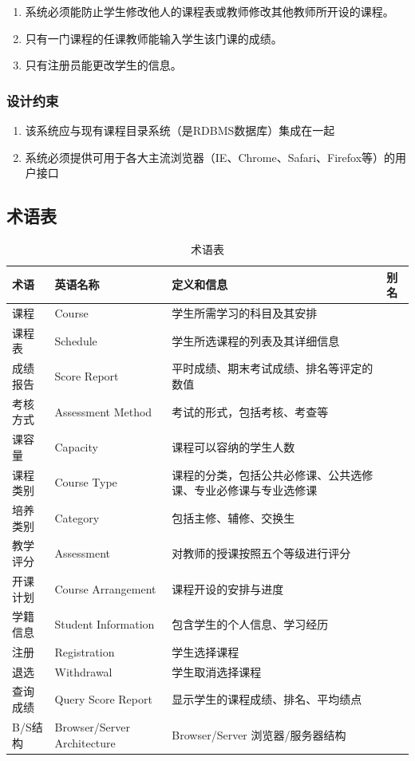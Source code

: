   \begin{enumerate}
    \item 系统必须能防止学生修改他人的课程表或教师修改其他教师所开设的课程。
    \item 只有一门课程的任课教师能输入学生该门课的成绩。
    \item 只有注册员能更改学生的信息。
  \end{enumerate}
  
\subsubsection{设计约束}
  
  \begin{enumerate}
    \item 该系统应与现有课程目录系统（是RDBMS数据库）集成在一起
    \item 系统必须提供可用于各大主流浏览器（IE、Chrome、Safari、Firefox等）的用户接口
  \end{enumerate}

\subsection{术语表}
  \begin{table}[H]
    \caption{术语表}
    \begin{tabularx}{\textwidth}{|l|l|X|l|}
    \hline
    \textbf{术语} & \textbf{英语名称} & \textbf{定义和信息} & \textbf{别名}\\
    \hline
    课程&Course&学生所需学习的科目及其安排&\\
    \hline
    课程表&Schedule&学生所选课程的列表及其详细信息&\\
    \hline
    成绩报告&Score Report&平时成绩、期末考试成绩、排名等评定的数值&\\
    \hline
    考核方式&Assessment Method&考试的形式，包括考核、考查等&\\
    \hline
    课容量&Capacity&课程可以容纳的学生人数&\\
    \hline
    课程类别&Course Type&课程的分类，包括公共必修课、公共选修课、专业必修课与专业选修课&\\
    \hline
    培养类别&Category&包括主修、辅修、交换生&\\
    \hline
    教学评分&Assessment&对教师的授课按照五个等级进行评分&\\
    \hline
    开课计划&Course Arrangement&课程开设的安排与进度&\\
    \hline
    学籍信息&Student Information&包含学生的个人信息、学习经历&\\
    \hline
    注册&Registration&学生选择课程&\\
    \hline
    退选&Withdrawal&学生取消选择课程&\\
    \hline
    查询成绩&Query Score Report&显示学生的课程成绩、排名、平均绩点&\\
    \hline
    B/S结构&Browser/Server Architecture&Browser/Server 浏览器/服务器结构&\\
    \hline
  \end{tabularx}
  
\end{table}


